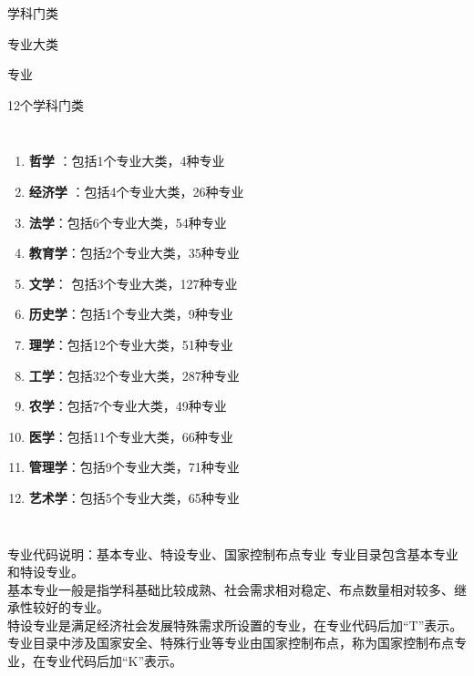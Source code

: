 \documentclass[aspectratio=169]{ctexbeamer} %
\date{\today}
\begin{document}
\begin{frame}{学科门类}
\end{frame}
\begin{frame}{专业大类}
\end{frame}
\begin{frame}{专业}
\end{frame}

\begin{frame}[t]{12个学科门类}
\begin{columns}
\begin{enumerate}[label={\arabic*.}]
\item \textbf{哲学 }：包括1个专业大类，4种专业
\item \textbf{经济学} ：包括4个专业大类，26种专业
\item \textbf{法学}：包括6个专业大类，54种专业
\item \textbf{教育学}：包括2个专业大类，35种专业
\item \textbf{文学}： 包括3个专业大类，127种专业
\item \textbf{历史学}：包括1个专业大类，9种专业
\item \textbf{理学}：包括12个专业大类，51种专业
\item \textbf{工学}：包括32个专业大类，287种专业
\item \textbf{农学}：包括7个专业大类，49种专业
\item \textbf{医学}：包括11个专业大类，66种专业
\item \textbf{管理学}：包括9个专业大类，71种专业
\item \textbf{艺术学}：包括5个专业大类，65种专业
\end{enumerate} 
\end{columns}
\end{frame}

\begin{frame}[t]{专业代码说明：基本专业、特设专业、国家控制布点专业}
专业目录包含\alert{基本专业}和\alert{特设专业}。\\

\vspace{1cm}
基本专业一般是指学科基础\alert{比较成熟}、\alert{社会需求相对稳定}、\alert{布点数量相对较多}、\alert{继承性较好}的专业。\\

\vspace{1cm}
特设专业是满足经济社会发展\alert{特殊需求}所设置的专业，在专业代码后加\alert{“T”}表示。\\

\vspace{1cm}
专业目录中涉及\alert{国家安全}、\alert{特殊行业}等专业\alert{由国家控制布点}，称为\alert{国家控制布点专业}，在专业代码后加\alert{“K”}表示。

\end{frame}
\end{document}
